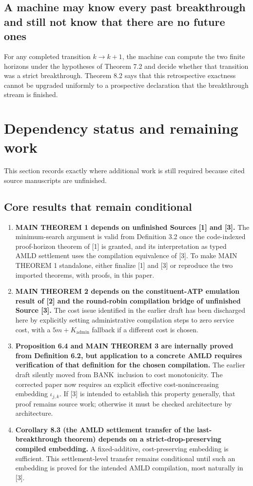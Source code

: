 \documentclass[11pt]{article}
\theoremstyle{definition}
\newcommand{\BANK}{\ensuremath{\mathrm{BANK}}}
\begin{document}
\subsection{A machine may know every past breakthrough and still not know that there are no future ones}
For any completed transition $k\to k+1$, the machine can compute the two finite horizons under the hypotheses of Theorem 7.2 and decide whether that transition was a strict breakthrough. Theorem 8.2 says that this retrospective exactness cannot be upgraded uniformly to a prospective declaration that the breakthrough stream is finished.

\section{Dependency status and remaining work}
This section records exactly where additional work is still required because cited source manuscripts are unfinished.

\subsection{Core results that remain conditional}
\begin{enumerate}[label=\textbf{D\arabic*.}]
\item \textbf{MAIN THEOREM 1 depends on unfinished Sources [1] and [3].} The minimum-search argument is valid from Definition 3.2 once the code-indexed proof-horizon theorem of [1] is granted, and its interpretation as typed AMLD settlement uses the compilation equivalence of [3]. To make MAIN THEOREM 1 standalone, either finalize [1] and [3] or reproduce the two imported theorems, with proofs, in this paper.

\item \textbf{MAIN THEOREM 2 depends on the constituent-ATP emulation result of [2] and the round-robin compilation bridge of unfinished Source [3].} The cost issue identified in the earlier draft has been discharged here by explicitly setting administrative compilation steps to zero service cost, with a $5m+K_{\mathrm{admin}}$ fallback if a different cost is chosen.

\item \textbf{Proposition 6.4 and MAIN THEOREM 3 are internally proved from Definition 6.2, but application to a concrete AMLD requires verification of that definition for the chosen compilation.} The earlier draft silently moved from \BANK\ inclusion to cost monotonicity. The corrected paper now requires an explicit effective cost-nonincreasing embedding $\iota_{j,k}$. If [3] is intended to establish this property generally, that proof remains source work; otherwise it must be checked architecture by architecture.

\item \textbf{Corollary 8.3 (the AMLD settlement transfer of the last-breakthrough theorem) depends on a strict-drop-preserving compiled embedding.} A fixed-additive, cost-preserving embedding is sufficient. This settlement-level transfer remains conditional until such an embedding is proved for the intended AMLD compilation, most naturally in [3].
\end{enumerate}
\end{document}
